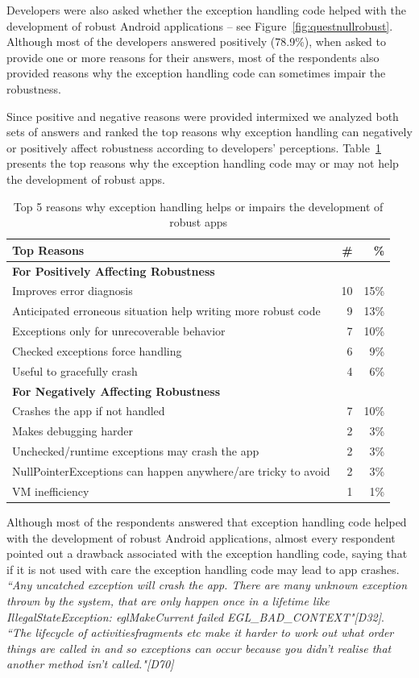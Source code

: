 Developers were also asked whether the exception handling code helped with the development of robust Android applications -- see Figure~\ref{fig:questnullrobust}. Although most of the developers answered positively (78.9\%), when asked to provide one or more reasons for their answers, most of the respondents also provided reasons why the exception handling code can sometimes impair the robustness.

Since positive and negative reasons were provided intermixed we analyzed both sets of answers and ranked the top reasons why exception handling can negatively or positively affect robustness according to developers' perceptions. Table~\ref{tab:topreasons} presents the top reasons why the exception handling code may or may not help the development of robust apps.

\begin{table}
\scriptsize
\centering
\begin{tabular}{lrr}
\hline
\bfseries{Top Reasons} & \bfseries{\#} & \bfseries{\%} \\
\hline
\bfseries{For Positively Affecting Robustness} &   &   \\
Improves error diagnosis  &	10	& 15\% \\
Anticipated erroneous situation help writing more robust code  & 9	 & 13\% \\
Exceptions only for unrecoverable behavior	& 7 &	10\% \\
Checked exceptions force handling  &	6	& 9\% \\
Useful to gracefully crash 	& 4 &	6\% \\

\bfseries{For Negatively Affecting Robustness} &   &   \\
Crashes the app if not handled	 & 7	& 10\% \\
Makes debugging harder &	2 &	3\% \\
Unchecked/runtime exceptions may crash the app & 2	& 3\% \\
NullPointerExceptions can happen anywhere/are tricky to avoid	 & 2	& 3\% \\
VM inefficiency 	& 1 & 1\% \\

\hline
\end{tabular}
\caption{Top 5 reasons why exception handling helps or impairs the development of robust apps}
\label{tab:topreasons}
\end{table}

Although most of the respondents answered that exception handling code helped with the development of robust Android applications, almost every respondent pointed out a drawback associated with the exception handling code, saying that if it is not used with care the exception handling code may lead to app crashes. \emph{``Any uncatched exception will crash the app. There are many unknown exception thrown by the system, that are only happen once in a lifetime like IllegalStateException: eglMakeCurrent failed EGL\_BAD\_CONTEXT"[D32]}. \emph{``The lifecycle of activities\/fragments etc make it harder to work out what order things are called in and so exceptions can occur because you didn't realise that another method isn't called."[D70]}

